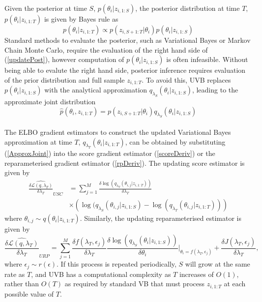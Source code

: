 \documentclass[12pt,a4paper]{article}\usepackage[]{graphicx}\usepackage[]{color}
\begin{document}
Given the posterior at time $S$, $p(\theta_{i} | z_{i, 1:S})$, the posterior distribution at time $T$, $p(\theta_{i} | z_{i, 1:T})$ is given by Bayes rule as
\begin{equation}
\label{updatePost}
p(\theta_{i} | z_{i, 1:T}) \propto p(z_{i, S+1:T} | \theta_{i})p(\theta_{i} | z_{i, 1:S})
\end{equation}
Standard methods to evaluate the posterior, such as Variational Bayes or Markov Chain Monte Carlo, require the evaluation of the right hand side of (\ref{updatePost}), however computation of $p(\theta_{i} | z_{i, 1:S})$ is often infeasible. Without being able to evalute the right hand side, posterior inference requires evaluation of the prior distribution and full sample $z_{i, 1:T}$. To avoid this, UVB replaces $p(\theta_{i} | z_{i, 1:S})$ with the analytical approximation $q_{\lambda_S}(\theta_{i} | z_{i, 1:S})$, leading to the approximate joint distribution
\begin{equation}
\label{ApproxJoint}
\hat{p}(\theta_{i},  z_{i, 1:T}) = p(z_{i, S+1:T} | \theta_{i})q_{\lambda_S}(\theta_{i} | z_{i, 1:S})
\end{equation}
\\

The ELBO gradient estimators to construct the updated Variational Bayes approximation at time $T$, $q_{\lambda_T}(\theta_{i} | z_{i, 1:T})$, can be obtained by substituting (\ref{ApproxJoint}) into the score gradient estimator (\ref{scoreDeriv}) or the reparameterised gradient estimator (\ref{rpDeriv}). The updating score estimator is given by
\begin{align}
\widehat{\frac{\delta\mathcal{L}(q, \lambda_T)}{\delta \lambda_T}}_{USC} &= \sum_{j = 1}^M \frac{\delta \log(q_{\lambda_T}(\theta_{i, j} | z_{i, 1:T}))}{\delta \lambda_T} \nonumber \\
&\times \left(\log(q_{\lambda_S}(\theta_{i, j} | z_{i, 1:S}) - \log(q_{\lambda_T}(\theta_{i, j} | z_{i, 1:T})) \right) \label{scoreUpdate}
\end{align}
where $\theta_{i, j} \sim q(\theta_{i} | z_{i, 1:T})$. Similarly, the updating reparameterised estimator is given by
\begin{equation}
\label{rpUpdate}
\widehat{\frac{\delta\mathcal{L}(q, \lambda_T)}{\delta \lambda_T}}_{URP} = \sum_{j = 1}^M \frac{\delta f(\lambda_T, \epsilon_j)}{\delta \lambda_T} \frac{\delta \log(q_{\lambda_S}(\theta_{i} |z_{i, 1:S}))}{\delta \theta_{i}} \bigg\rvert_{\theta_{i} = f(\lambda_T, \epsilon_j)} + \frac{\delta J(\lambda_T, \epsilon_j)}{\delta \lambda_T},
\end{equation}
where $\epsilon_j \sim r(\epsilon)$. If this process is repeated periodically, $S$ will grow at the same rate as $T$, and UVB has a computational complexity as $T$ increases of $O(1)$, rather than $O(T)$ as required by standard VB that must process $z_{i, 1:T}$ at each possible value of $T$. 
\end{document}

